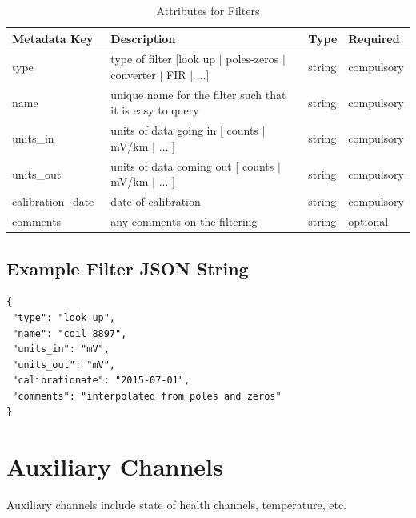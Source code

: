 \documentclass{article}
\begin{document}
\begin{table}[htb!]
    \caption[Attributes for Filter]{Attributes for Filters}
    \begin{tabular}{|l|p{3.5in}|l|l|}
        \hline
        \textbf{Metadata Key} & \textbf{Description} & \textbf{Type} & \textbf{Required} \\ \hline
        type\ & type of filter [look up $|$ poles-zeros $|$ converter $|$ FIR $|$ ...]& string &  compulsory \\ \hline
        name\ & unique name for the filter such that it is easy to query & string & compulsory \\ \hline
        units\_in\ & units of data going in [ counts $|$ mV/km $|$ ... ] & string & compulsory \\ \hline
        units\_out\ & units of data coming out [ counts $|$ mV/km $|$ ... ] & string & compulsory \\ \hline
        calibration\_date\ & date of calibration & string &  compulsory \\ \hline
        comments\ & any comments on the filtering & string &  optional \\ \hline
    \end{tabular}
    \label{tab:filter}
\end{table}

\subsection{Example Filter JSON String} 

\begin{verbatim}
{
 "type": "look up",
 "name": "coil_8897",
 "units_in": "mV",
 "units_out": "mV",
 "calibrationate": "2015-07-01",
 "comments": "interpolated from poles and zeros"
}
\end{verbatim}

\newpage

\section{Auxiliary Channels}

Auxiliary channels include state of health channels, temperature, etc.  
\end{document}
